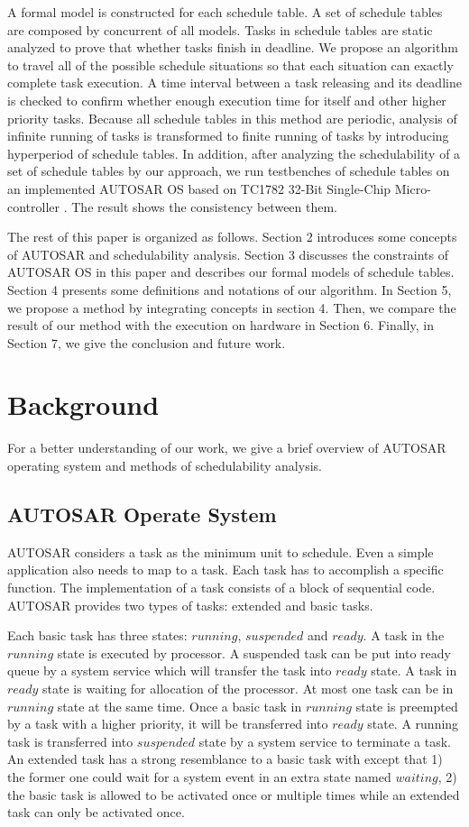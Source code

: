 \documentclass[sigconf]{acmart}
\begin{document}
A formal model is constructed for each schedule table. A set of schedule tables are composed by concurrent of all models. Tasks in schedule tables are static analyzed to prove that whether tasks finish in deadline. We propose an algorithm to travel all of the possible schedule situations so that each situation can exactly complete task execution. A time interval between a task releasing and its deadline is checked to confirm whether enough execution time for itself and other higher priority tasks. Because all schedule tables in this method are periodic, analysis of infinite running of tasks is transformed to finite running of tasks by introducing hyperperiod of schedule tables. In addition, after analyzing the schedulability of a set of schedule tables by our approach, we run testbenches of schedule tables on an implemented AUTOSAR OS based on TC1782 32-Bit Single-Chip Micro-controller \cite{infineon.org}. The result shows the consistency between them.


The rest of this paper is organized as follows. Section 2 introduces some concepts of AUTOSAR and schedulability analysis. Section 3 discusses the constraints of AUTOSAR OS in this paper and describes our formal models of schedule tables. Section 4 presents some definitions and notations of our algorithm. In Section 5, we propose a method by integrating concepts in section 4. Then, we compare the result of our method with the execution on hardware in Section 6. Finally, in Section 7, we give the conclusion and future work.
\section{Background}
For a better understanding of our work, we give a brief overview of AUTOSAR operating system and methods of schedulability analysis.
\subsection{AUTOSAR Operate System}

AUTOSAR considers a task as the minimum unit to schedule. Even a simple application also needs to map to a task. Each task has to accomplish a specific function. The implementation of a task consists of a block of sequential code. AUTOSAR provides two types of tasks: extended and basic tasks.

Each basic task has three states: $running$, $suspended$ and $ready$. A task in the $running$ state is executed by processor. A suspended task can be put into ready queue by a system service which will transfer the task into $ready$ state. A task in $ready$ state is waiting for allocation of the processor. At most one task can be in $running$ state at the same time. Once a basic task in $running$ state is preempted by a task with a higher priority, it will be transferred into $ready$ state. A running task is transferred into $suspended$ state by a system service to terminate a task. An extended task has a strong resemblance to a basic task with except that 1) the former one could wait for a system event in an extra state named $waiting$, 2) the basic task is allowed to be activated once or multiple times while an extended task can only be activated once. 
\end{document}
